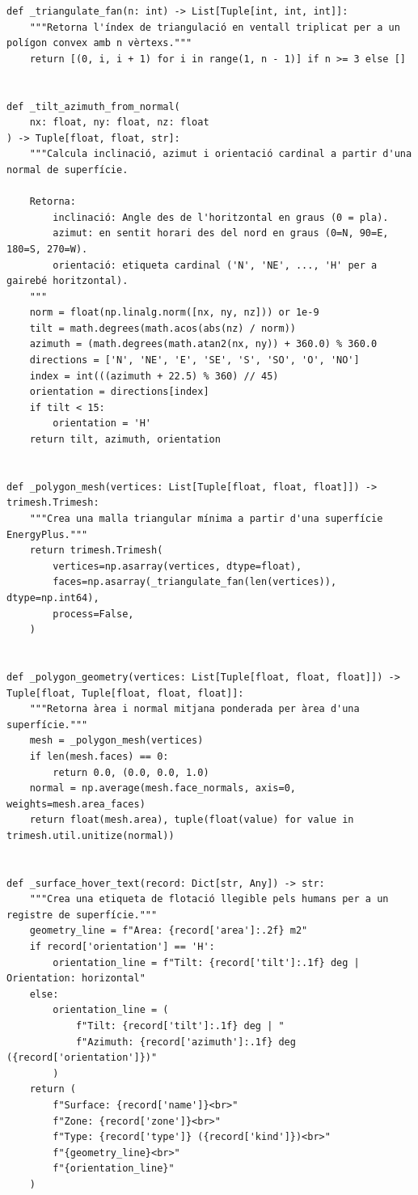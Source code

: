 \documentclass[10pt,a4paper]{article}
\begin{document}
\begin{lstlisting}[style=studioPython,caption={backend/viewer\_3d\_backend.py},label={lst:backend-viewer-3d-backend-py}]
def _triangulate_fan(n: int) -> List[Tuple[int, int, int]]:
    """Retorna l'índex de triangulació en ventall triplicat per a un polígon convex amb n vèrtexs."""
    return [(0, i, i + 1) for i in range(1, n - 1)] if n >= 3 else []


def _tilt_azimuth_from_normal(
    nx: float, ny: float, nz: float
) -> Tuple[float, float, str]:
    """Calcula inclinació, azimut i orientació cardinal a partir d'una normal de superfície.

    Retorna:
        inclinació: Angle des de l'horitzontal en graus (0 = pla).
        azimut: en sentit horari des del nord en graus (0=N, 90=E, 180=S, 270=W).
        orientació: etiqueta cardinal ('N', 'NE', ..., 'H' per a gairebé horitzontal).
    """
    norm = float(np.linalg.norm([nx, ny, nz])) or 1e-9
    tilt = math.degrees(math.acos(abs(nz) / norm))
    azimuth = (math.degrees(math.atan2(nx, ny)) + 360.0) % 360.0
    directions = ['N', 'NE', 'E', 'SE', 'S', 'SO', 'O', 'NO']
    index = int(((azimuth + 22.5) % 360) // 45)
    orientation = directions[index]
    if tilt < 15:
        orientation = 'H'
    return tilt, azimuth, orientation


def _polygon_mesh(vertices: List[Tuple[float, float, float]]) -> trimesh.Trimesh:
    """Crea una malla triangular mínima a partir d'una superfície EnergyPlus."""
    return trimesh.Trimesh(
        vertices=np.asarray(vertices, dtype=float),
        faces=np.asarray(_triangulate_fan(len(vertices)), dtype=np.int64),
        process=False,
    )


def _polygon_geometry(vertices: List[Tuple[float, float, float]]) -> Tuple[float, Tuple[float, float, float]]:
    """Retorna àrea i normal mitjana ponderada per àrea d'una superfície."""
    mesh = _polygon_mesh(vertices)
    if len(mesh.faces) == 0:
        return 0.0, (0.0, 0.0, 1.0)
    normal = np.average(mesh.face_normals, axis=0, weights=mesh.area_faces)
    return float(mesh.area), tuple(float(value) for value in trimesh.util.unitize(normal))


def _surface_hover_text(record: Dict[str, Any]) -> str:
    """Crea una etiqueta de flotació llegible pels humans per a un registre de superfície."""
    geometry_line = f"Area: {record['area']:.2f} m2"
    if record['orientation'] == 'H':
        orientation_line = f"Tilt: {record['tilt']:.1f} deg | Orientation: horizontal"
    else:
        orientation_line = (
            f"Tilt: {record['tilt']:.1f} deg | "
            f"Azimuth: {record['azimuth']:.1f} deg ({record['orientation']})"
        )
    return (
        f"Surface: {record['name']}<br>"
        f"Zone: {record['zone']}<br>"
        f"Type: {record['type']} ({record['kind']})<br>"
        f"{geometry_line}<br>"
        f"{orientation_line}"
    )



\end{lstlisting}
\end{document}
